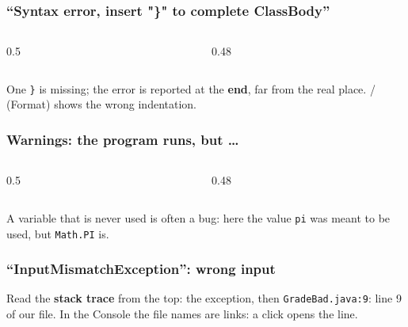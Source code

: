 \documentclass[aspectratio=169,10pt,compress]{beamer}
\begin{document}
\begin{frame}[t,fragile] \frametitle{``Syntax error, insert "\}" to complete ClassBody''}
  \begin{columns}[T]
    \begin{column}{0.5\textwidth}
    \end{column}
    \begin{column}{0.48\textwidth}
    \end{column}
  \end{columns}

  \vspace{0.2em}
  \small One \texttt{\}} is missing; the error is reported at the \textbf{end}, far from the real place.
   /  (Format) shows the wrong indentation.
\end{frame}




\begin{frame}[t,fragile] \frametitle{Warnings: the program runs, but \dots}
  \begin{columns}[T]
    \begin{column}{0.5\textwidth}
    \end{column}
    \begin{column}{0.48\textwidth}
    \end{column}
  \end{columns}

  \vspace{0.2em}
  \small A variable that is never used is often a bug: here the value \texttt{pi} was meant to be used, but \texttt{Math.PI} is.
\end{frame}





\begin{frame}[t,fragile] \frametitle{``InputMismatchException'': wrong input}

  \vspace{0.2em}
  \small Read the \textbf{stack trace} from the top: the exception, then \texttt{Grade\-Bad.java:9}: line 9 of our file.
  In the Console the file names are links: a click opens the line.
\end{frame}
\end{document}
